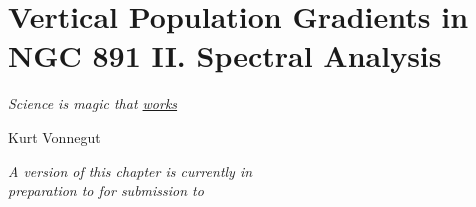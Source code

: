 
\chapter[NGC 891: Full Spectrum Analysis]{Vertical Population Gradients in NGC 891 II. Spectral Analysis}
\label{chap:891_2}
\epigraph{\fixspacing\emph{Science is magic that \underline{works}}}{Kurt Vonnegut}
\vfill
\begin{flushright}
  \fixspacing
  \textit{A version of this chapter is currently in \\
    preparation to for submission to \apj}
\end{flushright}
\vspace{1in}
\cleardoublepage

